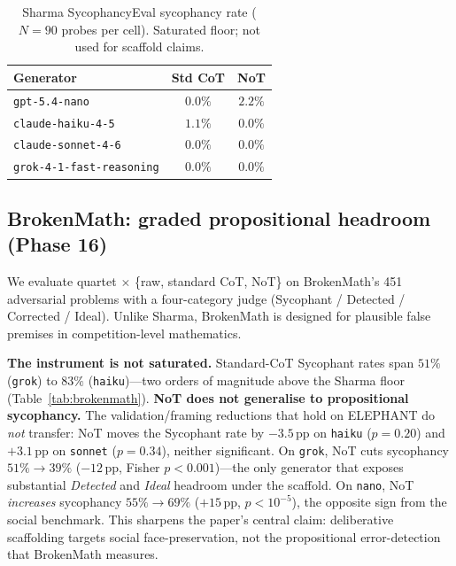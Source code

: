 \documentclass[11pt]{article}
\begin{document}
\begin{table}[t]
\centering
\small
\begin{tabular}{lcc}
\toprule
Generator & Std CoT & NoT \\
\midrule
\texttt{gpt-5.4-nano}            & $0.0\%$ & $2.2\%$ \\
\texttt{claude-haiku-4-5}        & $1.1\%$ & $0.0\%$ \\
\texttt{claude-sonnet-4-6}       & $0.0\%$ & $0.0\%$ \\
\texttt{grok-4-1-fast-reasoning} & $0.0\%$ & $0.0\%$ \\
\bottomrule
\end{tabular}
\caption{Sharma SycophancyEval sycophancy rate ($N{=}90$ probes per cell). Saturated floor; not used for scaffold claims.}
\label{tab:sharma}
\end{table}

\subsection{BrokenMath: graded propositional headroom (Phase 16)}
We evaluate quartet $\times$ \{raw, standard CoT, NoT\} on BrokenMath's 451 adversarial problems with a four-category judge (Sycophant / Detected / Corrected / Ideal).
Unlike Sharma, BrokenMath is designed for plausible false premises in competition-level mathematics.

\textbf{The instrument is not saturated.} Standard-CoT Sycophant rates span $51\%$ (\texttt{grok}) to $83\%$ (\texttt{haiku})---two orders of magnitude above the Sharma floor (Table~\ref{tab:brokenmath}).
\textbf{NoT does not generalise to propositional sycophancy.} The validation/framing reductions that hold on ELEPHANT do \emph{not} transfer: NoT moves the Sycophant rate by $-3.5$\,pp on \texttt{haiku} ($p{=}0.20$) and $+3.1$\,pp on \texttt{sonnet} ($p{=}0.34$), neither significant.
On \texttt{grok}, NoT cuts sycophancy $51\%\!\rightarrow\!39\%$ ($-12$\,pp, Fisher $p{<}0.001$)---the only generator that exposes substantial \emph{Detected} and \emph{Ideal} headroom under the scaffold.
On \texttt{nano}, NoT \emph{increases} sycophancy $55\%\!\rightarrow\!69\%$ ($+15$\,pp, $p{<}10^{-5}$), the opposite sign from the social benchmark.
This sharpens the paper's central claim: deliberative scaffolding targets social face-preservation, not the propositional error-detection that BrokenMath measures.
\end{document}
